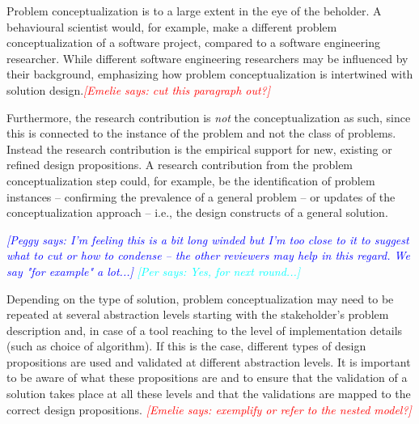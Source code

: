 \documentclass[graybox]{svmult}
\newcommand{\emelie}[1]{\textcolor{red}{{\it [Emelie says: #1]}}}
\newcommand{\peggy}[1]{\textcolor{blue}{{\it [Peggy says: #1]}}}
\newcommand{\per}[1]{\textcolor{cyan}{{\it [Per says: #1]}}}
\newcommand{\emelie}[1]{}
\newcommand{\peggy}[1]{}
\newcommand{\per}[1]{}
\begin{document}
Problem conceptualization is to a large extent in the eye of the beholder. A behavioural scientist would, for example,  make a different problem conceptualization of a software project, compared to a software engineering researcher. While different software engineering researchers may be influenced by their background, emphasizing how problem conceptualization is intertwined with solution design.\emelie{cut this paragraph out?}


Furthermore, the research contribution is \emph{not} the conceptualization as such, since this is connected to the instance of the problem and not the class of problems. Instead the research contribution is the empirical support for new, existing or refined design propositions. A research contribution from the problem conceptualization step could, for example, be the identification of problem instances -- confirming the prevalence of a general problem -- or updates of the conceptualization approach -- i.e., the design constructs of a general solution.

\peggy{I'm feeling this is a bit long winded but I'm too close to it to suggest what to cut or how to condense -- the other reviewers may help in this regard.  We say "for example" a lot...} \per{Yes, for next round...}


Depending on the type of solution, problem conceptualization may need to be repeated at several abstraction levels starting with the stakeholder's problem description and, in case of a tool reaching to the level of implementation details (such as  choice of algorithm). If this is the case, different types of design propositions are used and validated at different abstraction levels. It is important to be aware of what these propositions are and to ensure that the validation of a solution takes place at all these levels and that the validations are mapped to the correct design propositions. \emelie{exemplify or refer to the nested model?} 
\end{document}
